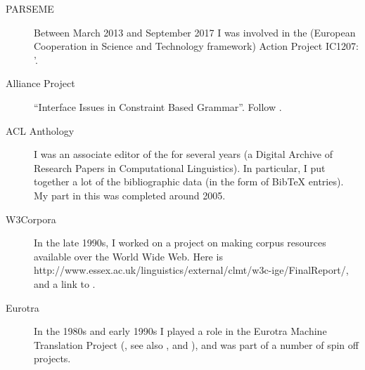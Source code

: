 \documentclass[a4paper]{article}
\begin{document}
\begin{description}

\item[PARSEME] Between March 2013 and September 2017 I was involved in the
   (European Cooperation in Science and Technology
  framework) Action Project IC1207: '.

\item[Alliance Project] ``Interface Issues in Constraint Based Grammar''.  Follow 
.


\item[ACL Anthology] I was an associate editor of the 
 for several years
(a Digital Archive of Research Papers in Computational Linguistics). In particular, I
put together a lot of the bibliographic data (in the form of BibTeX entries). My part
in this was completed around 2005.

\item[W3Corpora]
In the late 1990s, I worked on a project on
making corpus resources available over the World Wide Web. Here is
      {http://www.essex.ac.uk/linguistics/external/clmt/w3c-ige/FinalReport/}, and a link to 
.

\item[Eurotra]
In the 1980s and early 1990s I played a role in the Eurotra Machine Translation
Project (, see also
, and
), and was part of a number
of spin off projects.
\end{description}
\end{document}
